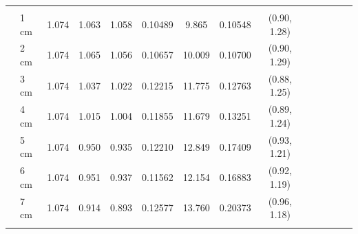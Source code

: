 \documentclass[a4paper 12pt]{article}
\numberwithin{equation}{section}
\begin{document}
\begin{small}
\begin{table}[h!]
\begin{footnotesize}
\begin{tabular}{clclclclclclcl}
 \raisebox{1ex}{\bf age 6+}  \\ [1.0ex]
&   1 cm & 1.074 &    1.063 & 1.058 &          0.10489& 9.865  & 0.10548 & (0.90, 1.28)\\
&   2 cm & 1.074 &    1.065 & 1.056 &          0.10657& 10.009 & 0.10700 & (0.90, 1.29)\\
&   3 cm & 1.074 &    1.037 & 1.022 &          0.12215& 11.775 & 0.12763 & (0.88, 1.25)\\
&   4 cm & 1.074 &    1.015 & 1.004 &          0.11855& 11.679 & 0.13251 & (0.89, 1.24)\\
&   5 cm & 1.074 &    0.950 & 0.935 &          0.12210& 12.849 & 0.17409 & (0.93, 1.21)\\
&   6 cm & 1.074 &    0.951 & 0.937 &          0.11562& 12.154 & 0.16883 & (0.92, 1.19)\\
&   7 cm & 1.074 &    0.914 & 0.893 &          0.12577& 13.760 & 0.20373 & (0.96, 1.18) \\[1.5ex]
  \hline \\
\end{tabular}
\end{footnotesize}
\end{table}
 \end{small}
\end{document}
